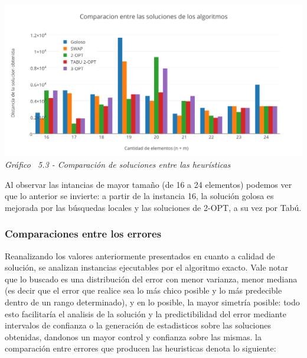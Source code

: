 \vspace*{0.3cm} \vspace*{0.3cm}
  \begin{center}
 \includegraphics[scale=0.5]{./EJ5/comparativo1.png}\\
 {\textit{Gráfico \ 5.3 - Comparaci\'on de soluciones entre las heur\'isticas}}
  \end{center}
  \vspace*{0.3cm}

Al observar las intancias de mayor tamaño (de 16 a 24 elementos) podemos ver que lo anterior se invierte: a partir de la instancia 16, la solución golosa es mejorada por las búsquedas locales y las soluciones de 2-OPT, a su vez por Tabú.

\subsubsection{Comparaciones entre los errores}

Reanalizando los valores anteriormente presentados en cuanto a calidad de solución, se analizan instancias ejecutables por el algoritmo exacto. Vale notar que lo buscado es una distribución del error con menor varianza, menor mediana (es decir que el error que realice sea lo más chico posible y lo más predecible dentro de un rango determinado), y en lo posible, la mayor simetría posible: todo esto facilitaría el analisis de la solución y la predictibilidad del error mediante intervalos de confianza o la generación de estadisticos sobre las soluciones obtenidas, dandonos un mayor control y confianza sobre las mismas. la comparación entre errores que producen las heuristicas denota lo siguiente:
	
